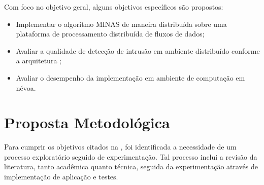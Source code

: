 Com foco no objetivo geral, alguns objetivos específicos são propostos:




\begin{itemize}

    \item Implementar o algoritmo MINAS de maneira distribuída sobre uma
    plataforma de processamento distribuída de fluxos de dados;

    \item Avaliar a qualidade de detecção de intrusão em ambiente distribuído 
    conforme a arquitetura \idsiot;
    
    \item Avaliar o desempenho da implementação em ambiente de computação em névoa.

\end{itemize}


\section{Proposta Metodológica}


Para cumprir os objetivos citados na , foi identificada a necessidade
de um processo exploratório seguido de experimentação. Tal processo inclui a
revisão da literatura, tanto acadêmica quanto técnica, seguida da experimentação
através de implementação de aplicação e testes.

